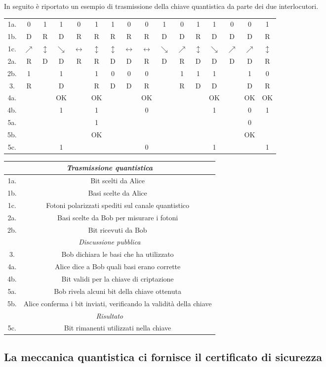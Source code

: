 \documentclass[italian,A4,12pt]{article}
\begin{document}
    In seguito è riportato un esempio di trasmissione della chiave quantistica da parte dei due interlocutori.
    \begin{center}
    \begin{tabular}{| c | c c c c c c c c c c c c c c c |}
      \hline
     1a.& 0 & 1 & 1 & 0 & 1 & 1 & 0 & 0 & 1 & 0 & 1 & 1 & 0 & 0 & 1\\
     1b.&D & R & D & R & R & R & R & R  & D & D & R & D & D & D & R\\
     1c. & $\nearrow$ & $\updownarrow$&$\searrow$ &$\leftrightarrow$ & $\updownarrow$& $\updownarrow$& $\leftrightarrow$&$\leftrightarrow$ & $\searrow$& $\nearrow$&$\updownarrow$&$\searrow$&$\nearrow$ & $\nearrow$ & $\updownarrow$ \\
     2a. & R&D&D&R&R&D&D&R&D&R&D&D&D&D&R\\
     2b. &1& &1& &1&0&0&0&&1&1&1&&1&0\\
     3. & R&&D&&R&D&D&R&&R&D&D&&D&R\\
     4a. &&&OK&&OK&&&OK&&&&OK&&OK&OK\\
     4b. &&&1&&1&&&0&&&&1&&0&1\\
     5a.&&&&&1&&&&&&&&&0&\\
     5b.&&&&&OK&&&&&&&&&OK&\\
     5c. &&&1&&&&&0&&&&1&&&1\\
      \hline
     \end{tabular}
    \end{center}

    \begin{center}
    \begin{tabular}{|c | c|}
      \hline
      \multicolumn{2}{|c|}{\textit{Trasmissione quantistica} }\\
      \hline
      1a.& Bit scelti da Alice\\
      1b.&Basi scelte da Alice\\
      1c. & Fotoni polarizzati spediti sul canale quantistico\\
      2a.& Basi scelte da Bob per misurare i fotoni\\
      2b.&Bit ricevuti da Bob\\
      \hline
      \multicolumn{2}{|c|}{\textit{Discussione pubblica}}\\
      \hline
      3. & Bob dichiara le basi che ha utilizzato\\
      4a.  & Alice dice a Bob quali basi erano corrette \\
      4b. & Bit validi per la chiave di criptazione\\
      5a. &Bob rivela alcuni bit della chiave ottenuta\\
      5b. & Alice conferma i bit inviati, verificando la validità della chiave\\
      \hline
      \multicolumn{2}{|c|}{\textit{Risultato}}\\
      \hline
      5c.& Bit rimanenti utilizzati nella chiave\\
      \hline
    \end{tabular}
    \end{center}
    \subsection{La meccanica quantistica ci fornisce il certificato di sicurezza}
\end{document}

